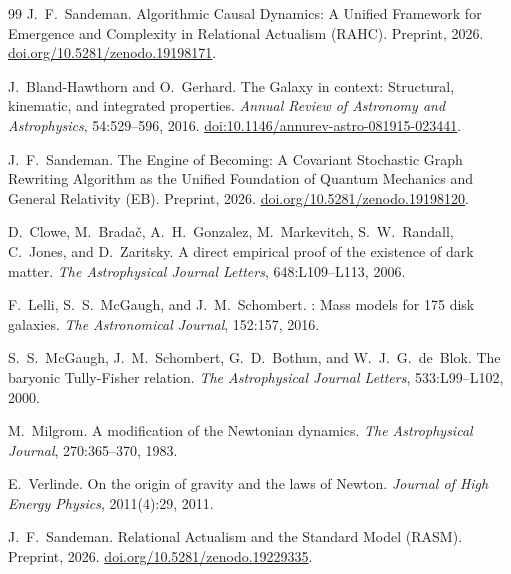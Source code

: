 \documentclass[11pt,a4paper]{article}
\theoremstyle{plain}
\theoremstyle{definition}
\theoremstyle{remark}
\begin{document}
\begin{thebibliography}{99}
J.~F.~Sandeman.
\newblock Algorithmic Causal Dynamics: A Unified Framework for Emergence and
  Complexity in Relational Actualism ({RAHC}).
\newblock Preprint, 2026.
\newblock \href{https://doi.org/10.5281/zenodo.19198171}{doi.org/10.5281/zenodo.19198171}.

J.~Bland-Hawthorn and O.~Gerhard.
\newblock The Galaxy in context: Structural, kinematic, and integrated
  properties.
\newblock \emph{Annual Review of Astronomy and Astrophysics}, 54:529--596, 2016.
\newblock \href{https://doi.org/10.1146/annurev-astro-081915-023441}{doi:10.1146/annurev-astro-081915-023441}.

J.~F.~Sandeman.
\newblock The Engine of Becoming: A Covariant Stochastic Graph Rewriting
  Algorithm as the Unified Foundation of Quantum Mechanics and General
  Relativity ({EB}).
\newblock Preprint, 2026.
\newblock \href{https://doi.org/10.5281/zenodo.19198120}{doi.org/10.5281/zenodo.19198120}.

D.~Clowe, M.~Brada\v{c}, A.~H.~Gonzalez, M.~Markevitch, S.~W.~Randall,
C.~Jones, and D.~Zaritsky.
\newblock A direct empirical proof of the existence of dark matter.
\newblock \textit{The Astrophysical Journal Letters}, 648:L109--L113, 2006.

F.~Lelli, S.~S.~McGaugh, and J.~M.~Schombert.
: Mass models for 175 disk galaxies.
\newblock \textit{The Astronomical Journal}, 152:157, 2016.

S.~S.~McGaugh, J.~M.~Schombert, G.~D.~Bothun, and W.~J.~G.~de~Blok.
\newblock The baryonic Tully-Fisher relation.
\newblock \textit{The Astrophysical Journal Letters}, 533:L99--L102, 2000.

M.~Milgrom.
\newblock A modification of the Newtonian dynamics.
\newblock \textit{The Astrophysical Journal}, 270:365--370, 1983.

E.~Verlinde.
\newblock On the origin of gravity and the laws of Newton.
\newblock \textit{Journal of High Energy Physics}, 2011(4):29, 2011.

J.~F.~Sandeman.
\newblock Relational Actualism and the Standard Model ({RASM}).
\newblock Preprint, 2026.
\newblock \href{https://doi.org/10.5281/zenodo.19229335}{doi.org/10.5281/zenodo.19229335}.


\end{thebibliography}
\end{document}
